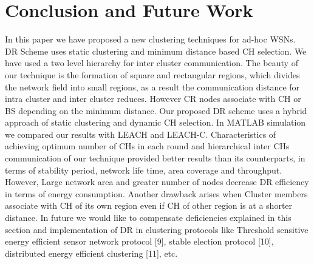 \documentclass[3p,times,procedia]{elsarticle}
\begin{document}
\section{Conclusion and Future Work}        In this paper we have proposed a new clustering techniques for ad-hoc WSNs. DR Scheme uses static clustering and minimum distance based CH selection. We have used a two level hierarchy for inter cluster communication. The beauty of our technique is the formation of square and rectangular regions, which divides the network field into small regions, as a result the communication distance for intra cluster and inter cluster reduces. However CR nodes associate with CH or BS depending on the minimum distance. Our proposed DR scheme uses a hybrid approach of static clustering and dynamic CH selection.
In MATLAB simulation we compared our results with LEACH and LEACH-C. Characteristics of achieving optimum number of CHs in each round and hierarchical inter CHs communication of our technique provided better results than its counterparts, in terms of  stability period, network life time, area coverage and throughput. However, Large network area and greater number of nodes decrease DR efficiency in terms of energy consumption. Another drawback arises when Cluster members associate with CH of its own region even if CH of other region is at a shorter distance. In future we would like to compensate deficiencies explained in this section and implementation of DR in clustering protocols like Threshold sensitive energy efficient sensor network protocol [9], stable election protocol [10], distributed energy efficient clustering [11], etc.
\end{document}
